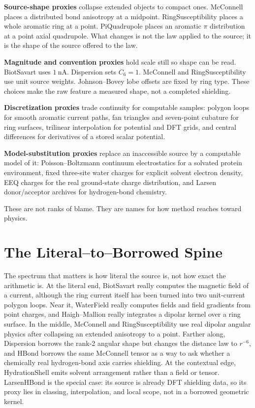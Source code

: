 \documentclass[11pt]{article}
\begin{document}
\textbf{Source-shape proxies} collapse extended objects to compact ones.
McConnell places a distributed bond anisotropy at a midpoint.
RingSusceptibility places a whole aromatic ring at a point. PiQuadrupole places
an aromatic \(\pi\) distribution at a point axial quadrupole. What changes is
not the law applied to the source; it is the shape of the source offered to the
law.

\textbf{Magnitude and convention proxies} hold scale still so shape can be read.
BiotSavart uses \(\SI{1}{\nano\ampere}\). Dispersion sets \(C_6=1\).
McConnell and RingSusceptibility use unit source weights. Johnson--Bovey lobe
offsets are fixed by ring type. These choices make the raw feature a measured
shape, not a completed shielding.

\textbf{Discretization proxies} trade continuity for computable samples:
polygon loops for smooth aromatic current paths, fan triangles and seven-point
cubature for ring surfaces, trilinear interpolation for potential and DFT grids,
and central differences for derivatives of a stored scalar potential.

\textbf{Model-substitution proxies} replace an inaccessible source by a
computable model of it: Poisson--Boltzmann continuum electrostatics for a
solvated protein environment, fixed three-site water charges for explicit
solvent electron density, EEQ charges for the real ground-state charge
distribution, and Larsen donor/acceptor archives for hydrogen-bond chemistry.

These are not ranks of blame. They are names for how method reaches toward
physics.

\section{The Literal--to--Borrowed Spine}

The spectrum that matters is how literal the source is, not how exact the
arithmetic is. At the literal end, BiotSavart really computes the magnetic
field of a current, although the ring current itself has been turned into two
unit-current polygon loops. Near it, WaterField really computes fields and
field gradients from point charges, and Haigh--Mallion really integrates a
dipolar kernel over a ring surface. In the middle, McConnell and
RingSusceptibility use real dipolar angular physics after collapsing an
extended anisotropy to a point. Farther along, Dispersion borrows the rank-2
angular shape but changes the distance law to \(r^{-6}\), and HBond borrows the
same McConnell tensor as a way to ask whether a chemically real hydrogen-bond
axis carries shielding. At the contextual edge, HydrationShell emits solvent
arrangement rather than a field or tensor. LarsenHBond is the special case: its
source is already DFT shielding data, so its proxy lies in classing,
interpolation, and local scope, not in a borrowed geometric kernel.
\end{document}
